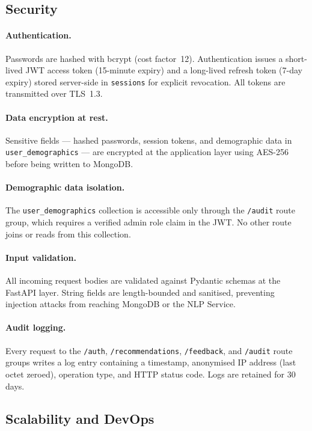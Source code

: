 \subsection{Security}

\paragraph{Authentication.}
Passwords are hashed with bcrypt (cost factor~12). Authentication issues a
short-lived JWT access token (15-minute expiry) and a long-lived refresh token
(7-day expiry) stored server-side in \texttt{sessions} for explicit
revocation. All tokens are transmitted over TLS~1.3.

\paragraph{Data encryption at rest.}
Sensitive fields --- hashed passwords, session tokens, and demographic data in
\texttt{user\_demographics} --- are encrypted at the application layer using
AES-256 before being written to MongoDB.

\paragraph{Demographic data isolation.}
The \texttt{user\_demographics} collection is accessible only through the
\texttt{/audit} route group, which requires a verified admin role claim in the
JWT. No other route joins or reads from this collection.

\paragraph{Input validation.}
All incoming request bodies are validated against Pydantic schemas at the
FastAPI layer. String fields are length-bounded and sanitised, preventing
injection attacks from reaching MongoDB or the NLP Service.

\paragraph{Audit logging.}
Every request to the \texttt{/auth}, \texttt{/recommendations},
\texttt{/feedback}, and \texttt{/audit} route groups writes a log entry
containing a timestamp, anonymised IP address (last octet zeroed), operation
type, and HTTP status code. Logs are retained for 30 days.

\subsection{Scalability and DevOps}


